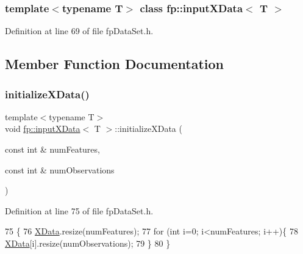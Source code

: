 \subsubsection*{template$<$typename T$>$\newline
class fp\+::input\+X\+Data$<$ T $>$}



Definition at line 69 of file fp\+Data\+Set.\+h.



\subsection{Member Function Documentation}
\mbox{\label{classfp_1_1inputXData_a2f49e8681655a35252b8c666a4ae826a}} 
\subsubsection{\texorpdfstring{initialize\+X\+Data()}{initializeXData()}}
{\footnotesize\ttfamily template$<$typename T$>$ \\
void \hyperlink{classfp_1_1inputXData}{fp\+::input\+X\+Data}$<$ T $>$\+::initialize\+X\+Data (\begin{DoxyParamCaption}\item[{const int \&}]{num\+Features,  }\item[{const int \&}]{num\+Observations }\end{DoxyParamCaption})\hspace{0.3cm}{\ttfamily [inline]}}



Definition at line 75 of file fp\+Data\+Set.\+h.


\begin{DoxyCode}
75                                                                                  \{
76             \hyperlink{classfp_1_1inputXData_ad08f8c44df38fb88799cda53cc50eaa5}{XData}.resize(numFeatures);
77             \textcolor{keywordflow}{for} (\textcolor{keywordtype}{int} i=0; i<numFeatures; i++)\{
78                 \hyperlink{classfp_1_1inputXData_ad08f8c44df38fb88799cda53cc50eaa5}{XData}[i].resize(numObservations);
79             \}
80         \}
\end{DoxyCode}
\mbox{\label{classfp_1_1inputXData_a2be81a23267dce73e72f8f9458427862}} 

